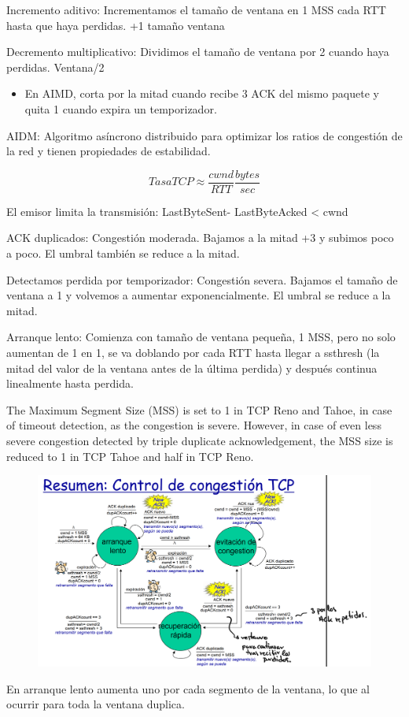 \documentclass[12pt, twoside, openright]{report} %
\begin{document}
	Incremento aditivo: Incrementamos el tamaño de ventana en 1 MSS cada
    RTT hasta que haya perdidas. +1 tamaño ventana

	Decremento multiplicativo: Dividimos el tamaño de ventana por 2
    cuando haya perdidas. Ventana/2

    \begin{itemize}
    \item
      En AIMD, corta por la mitad cuando recibe 3 ACK del mismo paquete
      y quita 1 cuando expira un temporizador.
    \end{itemize}

	AIDM: Algoritmo asíncrono distribuido para optimizar los ratios de
    congestión de la red y tienen propiedades de estabilidad.

	$$Tasa TCP \approx \frac {cwnd} {RTT} \frac {bytes}{sec}$$

	El emisor limita la transmisión: LastByteSent- LastByteAcked
    \textless{} cwnd

	ACK duplicados: Congestión moderada. Bajamos a la mitad +3 y
    subimos poco a poco. El umbral también se reduce a la mitad.

	Detectamos perdida por temporizador: Congestión severa. Bajamos el
    tamaño de ventana a 1 y volvemos a aumentar exponencialmente. El
    umbral se reduce a la mitad.

	Arranque lento: Comienza con tamaño de ventana pequeña, 1 MSS, pero
    no solo aumentan de 1 en 1, se va doblando por cada RTT hasta llegar
    a ssthresh (la mitad del valor de la ventana antes de la última
    perdida) y después continua linealmente hasta perdida.

	The Maximum Segment Size (MSS) is set to 1 in TCP Reno and Tahoe, in
    case of timeout detection, as the congestion is severe. However, in
    case of even less severe congestion detected by triple duplicate
    acknowledgement, the MSS size is reduced to 1 in TCP Tahoe and half
    in TCP Reno.
	\begin{figure}[H]
		{\includegraphics[scale=.15]{Untitled 19.png}}
	\end{figure}
    En arranque lento aumenta uno por cada segmento de la ventana, lo
    que al ocurrir para toda la ventana duplica.
\end{document}
